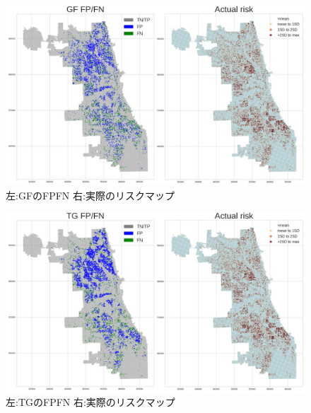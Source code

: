 \begin{figure}
  \centering %
  \includegraphics[scale=0.25]{./non-crime-no-timeseries-fig/GF_fnp.png}
  \caption{左:GFのFPFN 右:実際のリスクマップ}
  \label{fig:non-crime-no-timeseries-gf-fnp}
\end{figure}

\begin{figure}
  \centering %
  \includegraphics[scale=0.25]{./non-crime-no-timeseries-fig/TG_fnp.png}
  \caption{左:TGのFPFN 右:実際のリスクマップ}
  \label{fig:non-crime-no-timeseries-tg-fnp}
\end{figure}

